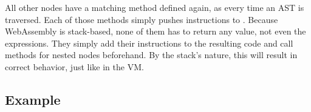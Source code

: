All other nodes have a matching method defined again, as every time an AST is traversed.
Each of those methods simply pushes instructions to .
Because WebAssembly is stack-based, none of them has to return any value, not even the expressions.
They simply add their instructions to the resulting code and call methods for nested nodes beforehand.
By the stack's nature, this will result in correct behavior, just like in the VM.


\subsection{Example}

